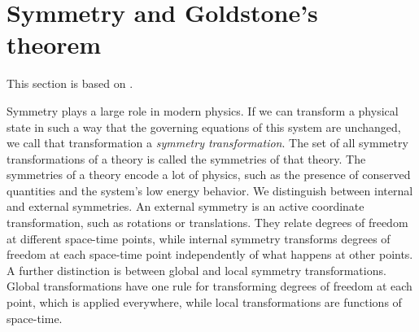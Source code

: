 \section{Symmetry and Goldstone's theorem}
\label{section:symmetry}

This section is based on \cite{weinberg_1995,weinberg_1996_vol2,Peskin:IntroQFT,smooth_manifolds}.

Symmetry plays a large role in modern physics.
If we can transform a physical state in such a way that the governing equations of this system are unchanged, we call that transformation a \emph{symmetry transformation}.
The set of all symmetry transformations of a theory is called the symmetries of that theory.
The symmetries of a theory encode a lot of physics, such as the presence of conserved quantities and the system's low energy behavior.
We distinguish between internal and external symmetries.
An external symmetry is an active coordinate transformation, such as rotations or translations.
They relate degrees of freedom at different space-time points, while internal symmetry transforms degrees of freedom at each space-time point independently of what happens at other points.
A further distinction is between global and local symmetry transformations.
Global transformations have one rule for transforming degrees of freedom at each point, which is applied everywhere, while local transformations are functions of space-time.

